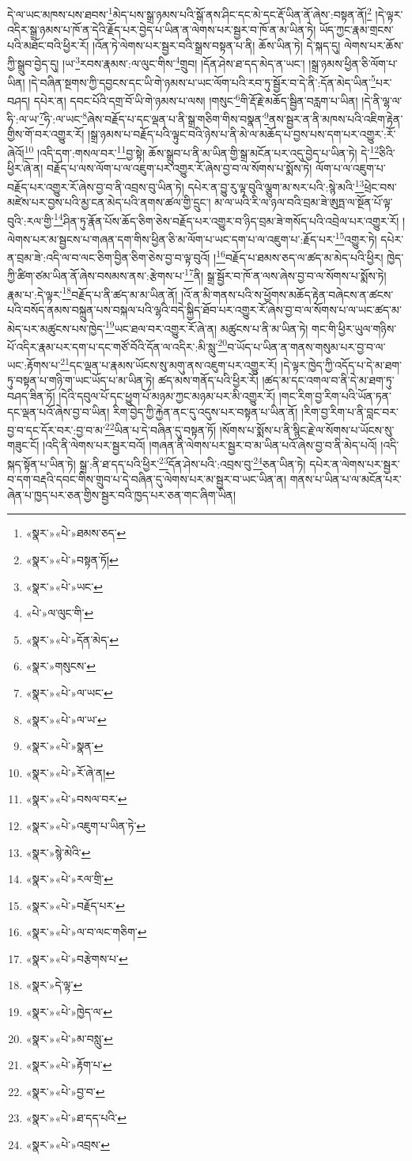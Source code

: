 དེ་ལ་ཡང་མཁས་པས་ཐབས་\footnote{«སྣར་»«པེ་»ཐམས་ཅད་}མེད་པས་སྒྲ་ཉམས་པའི་སྒོ་ནས་ཤིང་དང་མེ་དང་རྡོ་ཡིན་ནོ་ཞེས་:བསྟན་ནོ།\footnote{«སྣར་»«པེ་»བསྟན་ཏོ།} །དེ་ལྟར་འདིར་སྒྲ་ཉམས་པ་ཁོ་ན་དེའི་རྗོད་པར་བྱེད་པ་ཡིན་ན་ལེགས་པར་སྦྱར་བ་ཁོ་ན་མ་ཡིན་ཏེ། ཡོད་ཀྱང་རྣམ་གྲངས་པའི་མཐོང་བའི་ཕྱིར་རོ། །འོན་ཏེ་ལེགས་པར་སྦྱར་བའི་སྒྲས་བསྟན་པ་ནི། ཆོས་ཡིན་ཏེ། དེ་སྐད་དུ། ལེགས་པར་ཆོས་ཀྱི་སྒྲུབ་བྱེད་དུ། །ཡ་\footnote{«སྣར་»«པེ་»ཡང་}རབས་རྣམས་:ལ་ལུང་གིས་\footnote{«པེ་»ལ་ལུང་གི་}གྲུབ། །དོན་ཤེས་ཐ་དད་མེད་ན་ཡང་། །སྒྲ་ཉམས་ཕྱིན་ཅི་ལོག་པ་ཡིན། །དེ་བཞིན་སྔགས་ཀྱི་དབྱངས་དང་ཡི་གེ་ཉམས་པ་ཡང་ལོག་པའི་རབ་ཏུ་སྦྱོར་བ་དེ་ནི་:དོན་མེད་ཡིན་\footnote{«སྣར་»«པེ་»དོན་མེད་}པར་བཤད། དཔེར་ན། དབང་པོའི་དགྲ་བོ་ཡི་གེ་ཉམས་པ་ལས། །གསུང་\footnote{«སྣར་»གསུངས་}གི་རྡོ་རྗེ་མཆོད་སྦྱིན་བརླག་པ་ཡིན། །དེ་ནི་ལྷ་ལ་ཧི་:ལ་ཡ་\footnote{«སྣར་»«པེ་»ལ་ཡང་}ཧི་:ལ་ཡང་\footnote{«སྣར་»«པེ་»ལ་ཡ་}ཞེས་བརྗོད་པ་དང་ལྡན་པ་ནི་སྒྲ་གཅིག་གིས་བསྣན་\footnote{«སྣར་»«པེ་»སྣན་}ནས་སྦྱར་ན་ནི་མཁས་པའི་འཇིག་རྟེན་གྱིས་གོ་བར་འགྱུར་རོ། །སྒྲ་ཉམས་པ་བརྗོད་པའི་ལྟུང་བའི་ཉེས་པ་ནི་མེ་ལ་མཆོད་པ་བྱས་པས་དག་པར་འགྱུར་:རོ་ཞེའོ།\footnote{«སྣར་»«པེ་»རོ་ཞེ་ན།} །འདི་དག་:གསལ་བར་\footnote{«སྣར་»«པེ་»བསལ་བར་}བྱ་སྟེ། ཆོས་སྒྲུབ་པ་ནི་མ་ཡིན་གྱི་སྒྲ་མངོན་པར་འདུ་བྱེད་པ་ཡིན་ཏེ། དེ་\footnote{«སྣར་»«པེ་»འཇུག་པ་ཡིན་ཏེ་}ཅིའི་ཕྱིར་ཞེ་ན། བརྗོད་པ་ལས་ལོག་པ་ལ་འཇུག་པར་འགྱུར་རོ་ཞེས་བྱ་བ་ལ་སོགས་པ་སྨོས་ཏེ། ལོག་པ་ལ་འཇུག་པ་བརྗོད་པར་འགྱུར་རོ་ཞེས་བྱ་བ་ནི་འབྲས་བུ་ཡིན་ཏེ། དཔེར་ན་བྱུ་རུ་ལྟ་བུའི་ལྕུག་མ་སར་པའི་:སྙེ་མའི་\footnote{«སྣར་»སྙེ་མེའི་}ཕྲེང་བས་མཛེས་པར་བྱས་པའི་མྱ་ངན་མེད་པའི་ནགས་ཚལ་གྱི་དྲུང་། མ་ལ་ཡའི་རི་ལ་ཉལ་བའི་བྲམ་ཟེ་ཨུཏྤ་ལ་སྔོན་པོ་ལྟ་བུའི་:རལ་གྱི་\footnote{«སྣར་»«པེ་»རལ་གྲི་}ཤིན་ཏུ་རྣོན་པོས་ཆོད་ཅིག་ཅེས་བརྗོད་པར་འགྱུར་བ་ཉིད་བྲམ་ཟེ་གསོད་པའི་འབྲེལ་པར་འགྱུར་རོ། །ལེགས་པར་མ་སྦྱངས་པ་གཞན་དག་གིས་ཕྱིན་ཅི་མ་ལོག་པ་ཡང་དག་པ་ལ་འཇུག་པ་:རྗོད་པར་\footnote{«སྣར་»«པེ་»བརྗོད་པར་}འགྱུར་ཏེ། དཔེར་ན་བྲམ་ཟེ་:འདི་ལ་བ་ལང་ཅིག་བྱིན་ཅིག་ཅེས་བྱ་བ་ལྟ་བུའོ། །\footnote{«སྣར་»«པེ་»ལ་བ་ལང་གཅིག་}བརྗོད་པ་ཐམས་ཅད་ལ་ཚད་མ་མེད་པའི་ཕྱིར། ཁྱེད་ཀྱི་ཚིག་ཙམ་ཡིན་ནོ་ཞེས་བསམས་ནས་:རྩེགས་པ་\footnote{«སྣར་»«པེ་»བརྩེགས་པ་}ནི། སྒྲ་སྦྱོར་བ་ཁོ་ན་ལས་ཞེས་བྱ་བ་ལ་སོགས་པ་སྨོས་ཏེ། རྣམ་པ་:དེ་ལྟར་\footnote{«སྣར་»དེ་ལྟ་}བརྗོད་པ་ནི་ཚད་མ་མ་ཡིན་ནོ། །འོ་ན་མི་གནས་པའི་ས་ཕྱོགས་མཆོད་རྟེན་བཞེངས་ན་ཚངས་པའི་བསོད་ནམས་བསྐྲུན་པས་བསྐལ་པའི་ལྷའི་བདེ་སྐྱིད་ཐོབ་པར་འགྱུར་རོ་ཞེས་བྱ་བ་ལ་སོགས་པ་ལ་ཡང་ཚད་མ་མེད་པར་མཚུངས་པས་ཁྱེད་\footnote{«སྣར་»«པེ་»ཁྱེད་ལ་}ཡང་ཐལ་བར་འགྱུར་རོ་ཞེ་ན། མཚུངས་པ་ནི་མ་ཡིན་ཏེ། གང་གི་ཕྱིར་ཡུལ་གཉིས་པོ་འདིར་རྣམ་པར་དག་པ་དང་གཙོ་བོའི་དོན་ལ་འདིར་:མི་སླུ་\footnote{«སྣར་»«པེ་»མ་བསླུ་}བ་ཡོད་པ་ཡིན་ན་གནས་གསུམ་པར་བྱ་བ་ལ་ཡང་:རྟོགས་པ་\footnote{«སྣར་»«པེ་»རྟོག་པ་}དང་ལྡན་པ་རྣམས་ཡོངས་སུ་མགུ་ནས་འཇུག་པར་འགྱུར་རོ། །དེ་ལྟར་ཁྱེད་ཀྱི་འདོད་པ་དེ་མ་ཐག་ཏུ་བསྟན་པ་གཉི་ག་ཡང་ཡོད་པ་མ་ཡིན་ཏེ། ཚད་མས་གནོད་པའི་ཕྱིར་རོ། །ཚད་མ་དང་འགལ་བ་ནི་དེ་མ་ཐག་ཏུ་བཤད་ཟིན་ཏོ། །དེའི་དབུལ་པོ་དང་ཕྱུག་པོ་མཉམ་ཀྱང་མཉམ་པར་མི་འགྱུར་རོ། །གང་རིག་བྱ་རིག་པའི་ཡོན་ཏན་དང་ལྡན་པའོ་ཞེས་བྱ་བ་ཡིན། རིག་བྱེད་ཀྱི་རྐྱེན་ནང་དུ་འདུས་པར་བསྟན་པ་ཡིན་ནོ། །རིག་བྱ་རིག་པ་ནི་བླང་བར་བྱ་བ་དང་དོར་བར་:བྱ་བ་མ་\footnote{«སྣར་»«པེ་»བྱ་བ་}ཡིན་པ་དེ་བཞིན་དུ་བསྟན་ཏོ། །སོགས་པ་སྨོས་པ་ནི་སྙིང་རྗེ་ལ་སོགས་པ་ཡོངས་སུ་གཟུང་ངོ། །འདི་ནི་ལེགས་པར་སྦྱར་བའོ། །གཞན་ནི་ལེགས་པར་སྦྱར་བ་མ་ཡིན་པའོ་ཞེས་བྱ་བ་ནི་མེད་པའོ། །འདི་སྐད་སྟོན་པ་ཡིན་ཏེ། སྒྲ་:ནི་ཐ་དད་པའི་ཕྱིར་\footnote{«སྣར་»«པེ་»ཐ་དད་པའི་}དོན་ཤེས་པའི་:འབྲས་བུ་\footnote{«སྣར་»«པེ་»འབྲས་}ཅན་ཡིན་ཏེ། དཔེར་ན་ལེགས་པར་སྦྱར་བ་དག་བརྡའི་དབང་གིས་གྲུབ་པ་དེ་བཞིན་དུ་ལེགས་པར་མ་སྦྱར་བ་ཡང་ཡིན་ན། གནས་པ་ཡིན་པ་ལ་མངོན་པར་ཞེན་པ་ཁྱད་པར་ཅན་གྱིས་སྦྱར་བའི་ཁྱད་པར་ཅན་གང་ཞིག་ཡིན། 